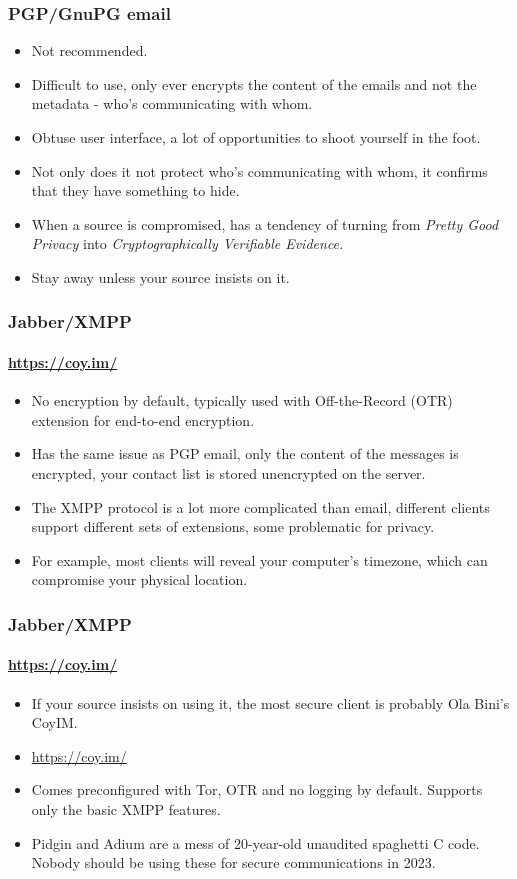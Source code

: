 \documentclass[aspectratio=169,usenames,dvipsnames]{beamer}
\begin{document}
\begin{frame}
  \frametitle{PGP/GnuPG email}

  \begin{itemize}[<+->]
    \item Not recommended.
    \item Difficult to use, only ever encrypts the content of the emails and
      not the metadata - who's communicating with whom.
    \item Obtuse user interface, a lot of opportunities to shoot yourself in
      the foot.
    \item Not only does it not protect who's communicating with whom, it
      confirms that they have something to hide.
    \item When a source is compromised, has a tendency of turning from
      \emph{Pretty Good Privacy} into \emph{Cryptographically Verifiable
      Evidence.}
    \item Stay away unless your source insists on it.
  \end{itemize}

\end{frame}

\begin{frame}
  \frametitle{Jabber/XMPP}
  \framesubtitle{\url{https://coy.im/}}

  \begin{itemize}[<+->]
    \item No encryption by default, typically used with Off-the-Record (OTR)
      extension for end-to-end encryption.
    \item Has the same issue as PGP email, only the content of the messages
      is encrypted, your contact list is stored unencrypted on the server.
    \item The XMPP protocol is a lot more complicated than email,
      different clients support different sets of extensions,
      some problematic for privacy.
    \item For example, most clients will reveal your computer's timezone,
      which can compromise your physical location.
  \end{itemize}

\end{frame}

\begin{frame}
  \frametitle{Jabber/XMPP}
  \framesubtitle{\url{https://coy.im/}}

  \begin{itemize}[<+->]
    \item If your source insists on using it, the most secure client is
      probably Ola Bini's CoyIM.
    \item \url{https://coy.im/}
    \item Comes preconfigured with Tor, OTR and no logging by default.
      Supports only the basic XMPP features.
    \item Pidgin and Adium are a mess of 20-year-old unaudited spaghetti C
      code. Nobody should be using these for secure communications in 2023.
  \end{itemize}

\end{frame}
\end{document}
